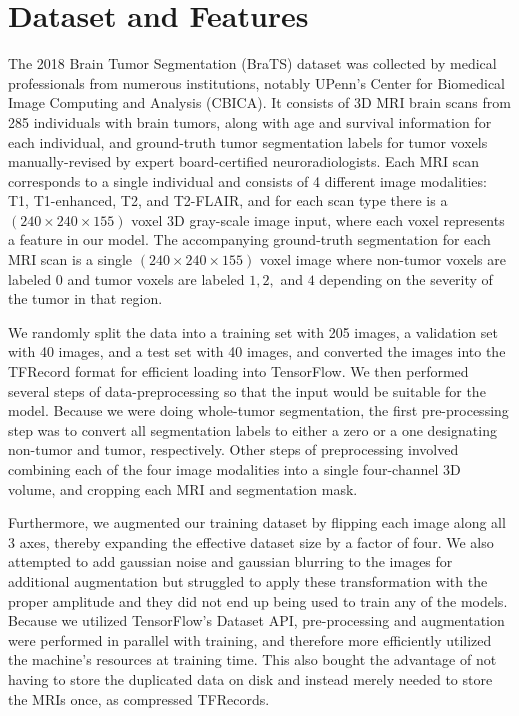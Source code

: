 \documentclass{article}
\newcommand\tab[1][0.5cm]{\hspace*{#1}}
\begin{document}
\section{Dataset and Features}
\tab The 2018 Brain Tumor Segmentation (BraTS) dataset was collected by medical professionals from numerous institutions, notably UPenn’s Center for Biomedical Image Computing and Analysis (CBICA). It consists of 3D MRI brain scans from 285 individuals with brain tumors, along with age and survival information for each individual, and ground-truth tumor segmentation labels for tumor voxels manually-revised by expert board-certified neuroradiologists. Each MRI scan corresponds to a single individual and consists of 4 different image modalities: T1, T1-enhanced, T2, and T2-FLAIR, and for each scan type there is a $(240 \times 240 \times 155)$ voxel 3D gray-scale image input, where each voxel represents a feature in our model. The accompanying ground-truth segmentation for each MRI scan is a single $(240 \times 240 \times 155)$ voxel image where non-tumor voxels are labeled $0$ and tumor voxels are labeled $1, 2,$ and $4$ depending on the severity of the tumor in that region.

We randomly split the data into a training set with 205 images, a validation set with 40 images, and a test set with 40 images, and converted the images into the TFRecord format for efficient loading into TensorFlow. We then performed several steps of data-preprocessing so that the input would be suitable for the model. Because we were doing whole-tumor segmentation, the first pre-processing step was to convert all segmentation labels to either a zero or a one designating non-tumor and tumor, respectively. Other steps of preprocessing involved combining each of the four image modalities into a single four-channel 3D volume, and cropping each MRI and segmentation mask.

Furthermore, we augmented our training dataset by flipping each image along all 3 axes, thereby expanding the effective dataset size by a factor of four. We also attempted to add gaussian noise and gaussian blurring to the images for additional augmentation but struggled to apply these transformation with the proper amplitude and they did not end up being used to train any of the models. Because we utilized TensorFlow's Dataset API, pre-processing and augmentation were performed in parallel with training, and therefore more efficiently utilized the machine's resources at training time. This also bought the advantage of not having to store the duplicated data on disk and instead merely needed to store the MRIs once, as compressed TFRecords.
\end{document}
